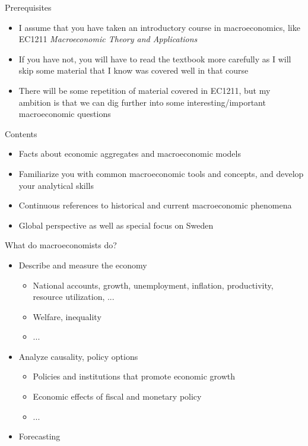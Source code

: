 \documentclass[10pt,handout]{beamer}
\begin{document}
\begin{frame}{Prerequisites}
\begin{itemize}
    \item I assume that you have taken an introductory course in macroeconomics, like EC1211 \textit{Macroeconomic Theory and Applications}\medskip
    \item If you have not, you will have to read the textbook more carefully as I will skip some material that I know was covered well in that course\medskip
    \item There will be some repetition of material covered in EC1211, but my ambition is that we can dig further into some interesting/important macroeconomic questions\medskip
\end{itemize}
\end{frame}


\begin{frame}{Contents}
\begin{itemize}
    \item Facts about economic aggregates and macroeconomic models\medskip
    \item Familiarize you with common macroeconomic tools and concepts, and develop your analytical skills\medskip
    \item Continuous references to historical and current macroeconomic phenomena\medskip
    \item Global perspective as well as special focus on Sweden\medskip
\end{itemize}
\end{frame}


\begin{frame}{What do macroeconomists do?}
\begin{itemize}
    \item[1.] Describe and measure the economy\smallskip
    \begin{itemize}
        \item National accounts, growth, unemployment, inflation, productivity, resource utilization, ...\smallskip
        \item Welfare, inequality\smallskip
        \item ...\smallskip
    \end{itemize}
    \item[2.] Analyze causality, policy options\smallskip
    \begin{itemize}
        \item Policies and institutions that promote economic growth\smallskip
        \item Economic effects of fiscal and monetary policy\smallskip
        \item ...\smallskip
    \end{itemize}
    \item[3.] Forecasting\smallskip
    \end{itemize}
\end{frame}
\end{document}

